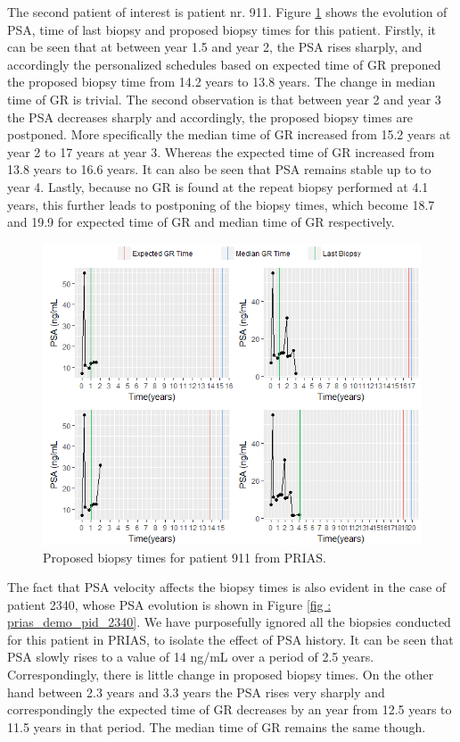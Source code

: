The second patient of interest is patient nr. 911. Figure \ref{fig : prias_demo_pid_911} shows the evolution of PSA, time of last biopsy and proposed biopsy times for this patient. Firstly, it can be seen that at between year 1.5 and year 2, the PSA rises sharply, and accordingly the personalized schedules based on expected time of GR preponed the proposed biopsy time from 14.2 years to 13.8 years. The change in median time of GR is trivial. The second observation is that between year 2 and year 3 the PSA decreases sharply and accordingly, the proposed biopsy times are postponed. More specifically the median time of GR increased from 15.2 years at year 2 to 17 years at year 3. Whereas the expected time of GR increased from 13.8 years to 16.6 years. It can also be seen that PSA remains stable up to to year 4. Lastly, because no GR is found at the repeat biopsy performed at 4.1 years, this further leads to postponing of the biopsy times, which become 18.7 and 19.9 for expected time of GR and median time of GR respectively.\\

\begin{figure}[!htb]
\centering
\captionsetup{justification=centering}
\includegraphics[width=\textwidth]{images/prias_demo/case_911.png}
\caption{\label{fig : prias_demo_pid_911} Proposed biopsy times for patient 911 from PRIAS.}
\end{figure}

The fact that PSA velocity affects the biopsy times is also evident in the case of patient 2340, whose PSA evolution is shown in Figure \ref{fig : prias_demo_pid_2340}. We have purposefully ignored all the biopsies conducted for this patient in PRIAS, to isolate the effect of PSA history. It can be seen that PSA slowly rises to a value of 14 ng/mL over a period of 2.5 years. Correspondingly, there is little change in proposed biopsy times. On the other hand between 2.3 years and 3.3 years the PSA rises very sharply and correspondingly the expected time of GR decreases by an year from 12.5 years to 11.5 years in that period. The median time of GR remains the same though.

